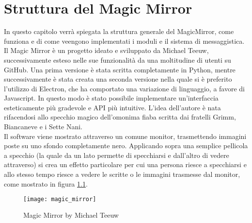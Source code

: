 \chapter{Struttura del Magic Mirror}\label{capitolo3}
In questo capitolo verrà spiegata la struttura generale del MagicMirror, come funziona e di come veengono implementati i
moduli e il sistema di messaggistica.
Il Magic Mirror \`e un progetto ideato e sviluppato da Michael Teeuw, successivamente esteso nelle sue funzionalit\`a da una moltitudine di utenti su GitHub.
Una prima versione \`e stata scritta completamente in Python, mentre successivamente \`e stata creata una seconda versione nella quale si \`e preferito l'utilizzo di Electron,
che ha comportato una variazione di linguaggio, a favore di Javascript. In questo modo \`e stato possibile implementare un'interfaccia esteticamente pi\`u gradevole
e API pi\`u intuitive.
L'idea dell'autore \`e nata rifacendosi allo specchio magico dell'omonima fiaba
scritta dai fratelli Grimm, Biancaneve e i Sette Nani.\\
Il software viene mostrato attraverso un
comune monitor, trasmettendo immagini poste su uno sfondo completamente nero. Applicando sopra
una semplice pellicola a specchio (la quale da un lato permette di specchiarsi e dall'altro di vedere
attraverso) si crea un effetto particolare per cui una persona riesce a specchiarsi
e allo stesso tempo riesce a vedere le scritte o le immagini trasmesse dal monitor,
come mostrato in figura \ref{fig:MM}.
\\[2\baselineskip]
\begin{figure}[H]
    \texttt{[image: magic\_mirror]}
    \caption{Magic Mirror by Michael Teeuw}
    \label{fig:MM}
\end{figure}

